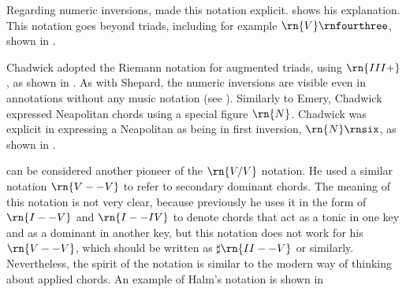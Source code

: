 



Regarding numeric inversions, \textcite{chadwick1897harmony}
made this notation explicit.
shows his explanation. This notation goes beyond triads,
including for example $\rn{V}\rnfourthree$, shown in
.






Chadwick adopted the Riemann notation for augmented triads,
using $\rn{III+}$, as shown in
. As with
Shepard, the numeric inversions are visible even in
annotations without any music notation (see
). Similarly
to Emery, Chadwick expressed Neapolitan chords using a
special figure $\rn{N}$. Chadwick was explicit in expressing
a Neapolitan as being in first inversion, $\rn{N}\rnsix$, as
shown in .

\textcite{halm1900harmonielehre} can be considered another
pioneer of the $\rn{V/V}$ notation. He used a similar
notation $\rn{V--V}$ to refer to secondary dominant chords.
The meaning of this notation is not very clear, because
previously he uses it in the form of $\rn{I--V}$ and
$\rn{I--IV}$ to denote chords that act as a tonic in one key
and as a dominant in another key, but this notation does not
work for his $\rn{V--V}$, which should be written as
$\sharp{}\rn{II--V}$ or similarly. Nevertheless, the spirit
of the notation is similar to the modern way of thinking
about applied chords. An example of Halm's notation is shown
in

